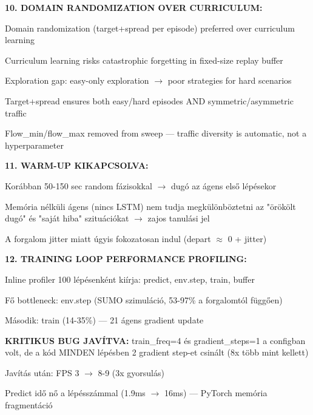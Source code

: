 \documentclass[11pt,a4paper]{article}
\begin{document}
\textbf{10. DOMAIN RANDOMIZATION OVER CURRICULUM:}
\par\noindent\hspace*{1em}\textbullet{} Domain randomization (target+spread per episode) preferred over curriculum learning
\par\noindent\hspace*{1em}\textbullet{} Curriculum learning risks catastrophic forgetting in fixed-size replay buffer
\par\noindent\hspace*{1em}\textbullet{} Exploration gap: easy-only exploration $\rightarrow$ poor strategies for hard scenarios
\par\noindent\hspace*{1em}\textbullet{} Target+spread ensures both easy/hard episodes AND symmetric/asymmetric traffic
\par\noindent\hspace*{1em}\textbullet{} Flow\_min/flow\_max removed from sweep — traffic diversity is automatic, not a hyperparameter

\textbf{11. WARM-UP KIKAPCSOLVA:}
\par\noindent\hspace*{1em}\textbullet{} Korábban 50-150 sec random fázisokkal $\rightarrow$ dugó az ágens első lépésekor
\par\noindent\hspace*{1em}\textbullet{} Memória nélküli ágens (nincs LSTM) nem tudja megkülönböztetni az
"örökölt dugó" és "saját hiba" szituációkat $\rightarrow$ zajos tanulási jel
\par\noindent\hspace*{1em}\textbullet{} A forgalom jitter miatt úgyis fokozatosan indul (depart $\approx$ 0 + jitter)

\textbf{12. TRAINING LOOP PERFORMANCE PROFILING:}
\par\noindent\hspace*{1em}\textbullet{} Inline profiler 100 lépésenként kiírja: predict, env.step, train, buffer
\par\noindent\hspace*{1em}\textbullet{} Fő bottleneck: env.step (SUMO szimuláció, 53-97\% a forgalomtól függően)
\par\noindent\hspace*{1em}\textbullet{} Második: train (14-35\%) — 21 ágens gradient update
\par\noindent\hspace*{1em}\textbullet{} \textbf{KRITIKUS BUG JAVÍTVA:} train\_freq=4 és gradient\_steps=1 a configban volt,
de a kód MINDEN lépésben 2 gradient step-et csinált (8x több mint kellett)
\par\noindent\hspace*{1em}\textbullet{} Javítás után: FPS 3 $\rightarrow$ 8-9 (3x gyorsulás)
\par\noindent\hspace*{1em}\textbullet{} Predict idő nő a lépésszámmal (1.9ms $\rightarrow$ 16ms) — PyTorch memória fragmentáció
\end{document}
